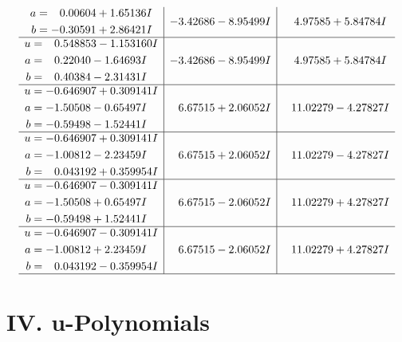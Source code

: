 \documentclass[1p]{elsarticle_modified}
\theoremstyle{definition}
\begin{document}
$$\begin{array}{c|c|c}
\begin{aligned}
a &= \phantom{-}0.00604 + 1.65136 I \\
b &= -0.30591 + 2.86421 I\end{aligned}
 & -3.42686 - 8.95499 I & \phantom{-}4.97585 + 5.84784 I \\ \hline\begin{aligned}
u &= \phantom{-}0.548853 - 1.153160 I \\
a &= \phantom{-}0.22040 - 1.64693 I \\
b &= \phantom{-}0.40384 - 2.31431 I\end{aligned}
 & -3.42686 - 8.95499 I & \phantom{-}4.97585 + 5.84784 I \\ \hline\begin{aligned}
u &= -0.646907 + 0.309141 I \\
a &= -1.50508 - 0.65497 I \\
b &= -0.59498 - 1.52441 I\end{aligned}
 & \phantom{-}6.67515 + 2.06052 I & \phantom{-}11.02279 - 4.27827 I \\ \hline\begin{aligned}
u &= -0.646907 + 0.309141 I \\
a &= -1.00812 - 2.23459 I \\
b &= \phantom{-}0.043192 + 0.359954 I\end{aligned}
 & \phantom{-}6.67515 + 2.06052 I & \phantom{-}11.02279 - 4.27827 I \\ \hline\begin{aligned}
u &= -0.646907 - 0.309141 I \\
a &= -1.50508 + 0.65497 I \\
b &= -0.59498 + 1.52441 I\end{aligned}
 & \phantom{-}6.67515 - 2.06052 I & \phantom{-}11.02279 + 4.27827 I \\ \hline\begin{aligned}
u &= -0.646907 - 0.309141 I \\
a &= -1.00812 + 2.23459 I \\
b &= \phantom{-}0.043192 - 0.359954 I\end{aligned}
 & \phantom{-}6.67515 - 2.06052 I & \phantom{-}11.02279 + 4.27827 I\\
 \hline 
 \end{array}$$\newpage
\newpage\renewcommand{\arraystretch}{1}
\centering \section*{ IV. u-Polynomials}
\end{document}
